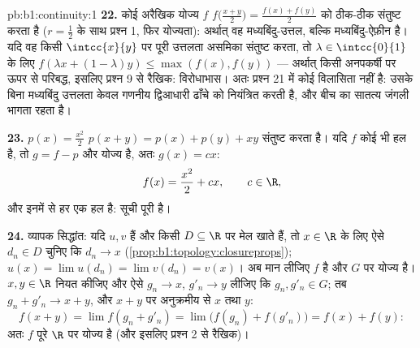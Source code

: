 \begin{solution}{pb:b1:continuity:1}
\textbf{22.} कोई अरैखिक योज्य $f$ $f\bigl(\frac{x+y}{2}\bigr) = \frac{f(x) +
f(y)}{2}$ को ठीक-ठीक संतुष्ट करता है ($r = \frac12$ के साथ प्रश्न 1, फिर
योज्यता): अर्थात् वह मध्यबिंदु-उत्तल, बल्कि मध्यबिंदु-ऐफ़ीन है। यदि वह किसी
 $\intcc{x}{y}$ पर पूरी उत्तलता असमिका संतुष्ट करता, तो $\lambda \in
\intcc{0}{1}$ के लिए $f(\lambda x + (1-\lambda)y) \leq \max(f(x), f(y))$ ---
अर्थात् किसी अनपकर्षी  पर ऊपर से परिबद्ध, इसलिए प्रश्न 9 से रैखिक:
विरोधाभास। अतः प्रश्न 21 में  कोई विलासिता नहीं है: उसके बिना
मध्यबिंदु उत्तलता केवल गणनीय द्विआधारी ढाँचे को नियंत्रित करती है, और बीच का
सातत्य जंगली भागता रहता है।

\textbf{23.} $p(x) = \frac{x^2}{2}$ $p(x+y) = p(x) + p(y) + xy$ संतुष्ट करता
है। यदि $f$ कोई भी  हल है, तो $g = f - p$  और योज्य है, अतः $g(x) =
cx$:
\[
f(x) = \frac{x^2}{2} + cx , \qquad c \in \R ,
\]
और इनमें से हर एक हल है: सूची पूरी है।

\textbf{24.} व्यापक सिद्धांत: यदि $u, v$  हैं और किसी  $D \subseteq
\R$ पर मेल खाते हैं, तो $x \in \R$ के लिए ऐसे $d_n \in D$ चुनिए कि $d_n \to
x$ (\cref{prop:b1:topology:closureprops}); $u(x) = \lim u(d_n) = \lim v(d_n)
= v(x)$। अब मान लीजिए $f$  है और   $G$ पर योज्य है। $x, y \in
\R$ नियत कीजिए और ऐसे $g_n \to x$, $g'_n \to y$ लीजिए कि $g_n, g'_n \in G$;
तब $g_n + g'_n \to x + y$, और $x + y$ पर अनुक्रमीय  से $x$ तथा $y$:
\[
f(x + y) = \lim f(g_n + g'_n) = \lim\bigl(f(g_n) +
f(g'_n)\bigr) = f(x) + f(y) :
\]
अतः $f$ पूरे $\R$ पर योज्य है (और इसलिए प्रश्न 2 से रैखिक)।


\end{solution}
